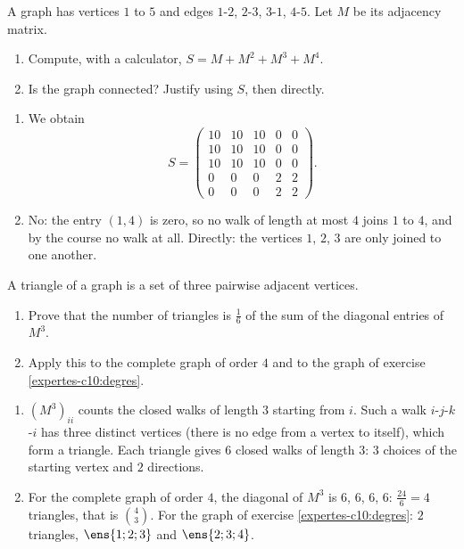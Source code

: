\begin{exercise}
A graph has vertices $1$ to $5$ and edges $1$-$2$, $2$-$3$, $3$-$1$, $4$-$5$. Let $M$ be its adjacency matrix.
\begin{enumerate}
\item Compute, with a calculator, $S=M+M^2+M^3+M^4$.
\item Is the graph connected? Justify using $S$, then directly.
\end{enumerate}
\end{exercise}
\begin{solution}
\begin{enumerate}
\item We obtain \[S=\begin{pmatrix}10&10&10&0&0\\10&10&10&0&0\\10&10&10&0&0\\0&0&0&2&2\\0&0&0&2&2\end{pmatrix}.\]
\item No: the entry $(1,4)$ is zero, so no walk of length at most $4$ joins $1$ to $4$, and by the course no walk at all. Directly: the vertices $1$, $2$, $3$ are only joined to one another.
\end{enumerate}
\end{solution}

\begin{exercise}
A triangle of a graph is a set of three pairwise adjacent vertices.
\begin{enumerate}
\item Prove that the number of triangles is $\frac16$ of the sum of the diagonal entries of $M^3$.
\item Apply this to the complete graph of order $4$ and to the graph of exercise \ref{expertes-c10:degres}.
\end{enumerate}
\end{exercise}
\begin{solution}
\begin{enumerate}
\item $\left(M^3\right)_{ii}$ counts the closed walks of length $3$ starting from $i$. Such a walk $i$-$j$-$k$-$i$ has three distinct vertices (there is no edge from a vertex to itself), which form a triangle. Each triangle gives $6$ closed walks of length $3$: $3$ choices of the starting vertex and $2$ directions.
\item For the complete graph of order $4$, the diagonal of $M^3$ is $6$, $6$, $6$, $6$: $\frac{24}6=4$ triangles, that is $\binom43$. For the graph of exercise \ref{expertes-c10:degres}: $2$ triangles, $\ens{1;2;3}$ and $\ens{2;3;4}$.
\end{enumerate}
\end{solution}

